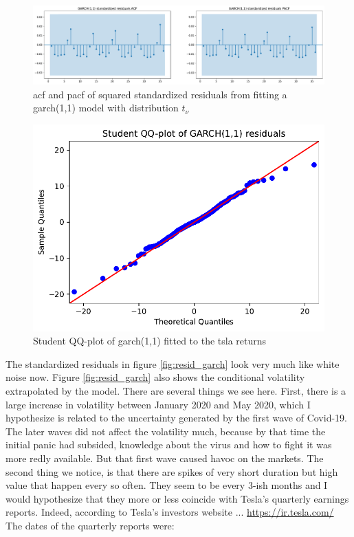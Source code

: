\begin{figure}
	\centering
	\includegraphics[width=\textwidth]{img/img_acf_garch.pdf}
	\caption{\acrshort{acf} and \acrshort{pacf} of squared standardized residuals from fitting a \acrshort{garch}(1,1) model with distribution $t_{\nu}$}
	\label{fig:acf_sgarch}
\end{figure}

\begin{figure}
	\centering
	\includegraphics[width=\textwidth]{img/img_sqq_garch.pdf}
	\caption{Student QQ-plot of \acrshort{garch}(1,1) fitted to the \acrshort{tsla} returns}
	\label{fig:tqq_garch}
\end{figure}

The standardized residuals in figure \ref{fig:resid_garch} look very much like white noise now. Figure \ref{fig:resid_garch} also shows the conditional volatility extrapolated by the model. There are several things we see here. First, there is a large increase in volatility between January 2020 and May 2020, which I hypothesize is related to the uncertainty generated by the first wave of Covid-19. The later waves did not affect the volatility much, because by that time the initial panic had subsided, knowledge about the virus and how to fight it was more redly available. But that first wave caused havoc on the markets. The second thing we notice, is that there are spikes of very short duration but high value that happen every so often. They seem to be every 3-ish months and I would hypothesize that they more or less coincide with Tesla's quarterly earnings reports.
Indeed, according to Tesla's investors website ... \url{https://ir.tesla.com/}
The dates of the quarterly reports were:

